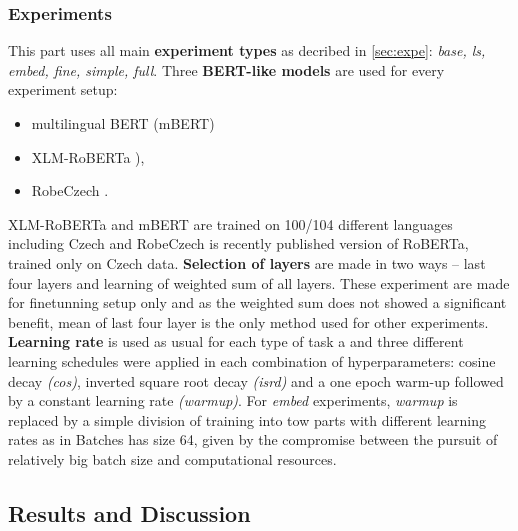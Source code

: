\subsubsection{Experiments}
This part uses all main \textbf{experiment types} as decribed in \ref{sec:expe}: \textit{base, ls, embed, fine, simple, full}. Three \textbf{BERT-like models} are used for every experiment setup:
\begin{itemize}
\item multilingual BERT (mBERT) \citep{Devlin2019} 
\item XLM-RoBERTa \citep{Conneau2019}), 
\item RobeCzech \citep{Straka2021}.
\end{itemize}
XLM-RoBERTa and mBERT are trained on 100/104 different languages including Czech and RobeCzech is recently published version of RoBERTa, trained only on Czech data. %
\textbf{Selection of layers} are made in two ways -- last four layers and learning of weighted sum of all layers. These experiment are made for finetunning setup only and as the weighted sum does not showed a significant benefit, mean of last four layer is the only method used for other experiments. %
 \textbf{Learning rate} is used as usual for each type of task a and three different learning schedules were applied in each combination of hyperparameters: cosine decay \textit{(cos)}, inverted square root decay \textit{(isrd)} and a one epoch warm-up followed by a constant learning rate \textit{(warmup)}. For \textit{embed} experiments, \textit{warmup} is replaced by  a simple division of training into tow parts with different learning rates as in %
Batches has size 64, given by the compromise between the pursuit of relatively big batch size and computational resources. %

\subsection{Results and Discussion}

